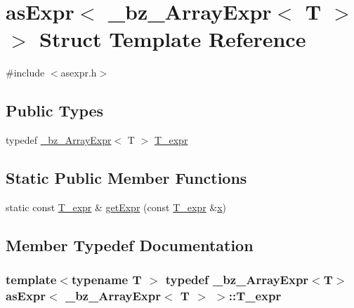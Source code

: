 \hypertarget{structasExpr_3_01__bz__ArrayExpr_3_01T_01_4_01_4}{}\section{as\+Expr$<$ \+\_\+bz\+\_\+\+Array\+Expr$<$ T $>$ $>$ Struct Template Reference}
\label{structasExpr_3_01__bz__ArrayExpr_3_01T_01_4_01_4}


{\ttfamily \#include $<$asexpr.\+h$>$}

\subsection*{Public Types}
\begin{DoxyCompactItemize}
\item 
typedef \hyperlink{class__bz__ArrayExpr}{\+\_\+bz\+\_\+\+Array\+Expr}$<$ T $>$ \hyperlink{structasExpr_3_01__bz__ArrayExpr_3_01T_01_4_01_4_a1f1d63cde63a7dfb8891073d79a5dd83}{T\+\_\+expr}
\end{DoxyCompactItemize}
\subsection*{Static Public Member Functions}
\begin{DoxyCompactItemize}
\item 
static const \hyperlink{structasExpr_3_01__bz__ArrayExpr_3_01T_01_4_01_4_a1f1d63cde63a7dfb8891073d79a5dd83}{T\+\_\+expr} \& \hyperlink{structasExpr_3_01__bz__ArrayExpr_3_01T_01_4_01_4_a2ac6a641492c8c1e76372b71981f4719}{get\+Expr} (const \hyperlink{structasExpr_3_01__bz__ArrayExpr_3_01T_01_4_01_4_a1f1d63cde63a7dfb8891073d79a5dd83}{T\+\_\+expr} \&\hyperlink{vecnorm1_8cc_ac73eed9e41ec09d58f112f06c2d6cb63}{x})
\end{DoxyCompactItemize}


\subsection{Member Typedef Documentation}
\hypertarget{structasExpr_3_01__bz__ArrayExpr_3_01T_01_4_01_4_a1f1d63cde63a7dfb8891073d79a5dd83}{}
\subsubsection[{T\+\_\+expr}]{\setlength{\rightskip}{0pt plus 5cm}template$<$typename T $>$ typedef {\bf \+\_\+bz\+\_\+\+Array\+Expr}$<$T$>$ {\bf as\+Expr}$<$ {\bf \+\_\+bz\+\_\+\+Array\+Expr}$<$ T $>$ $>$\+::{\bf T\+\_\+expr}}\label{structasExpr_3_01__bz__ArrayExpr_3_01T_01_4_01_4_a1f1d63cde63a7dfb8891073d79a5dd83}



